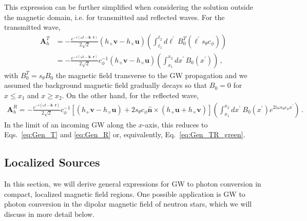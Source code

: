 \documentclass[a4paper,11pt]{article}
\begin{document}
%
This expression can be further simplified when considering the solution outside the magnetic domain, i.e. for transmitted and reflected waves.
%
For the transmitted wave,
%
\begin{equation}
    \begin{aligned}
    \bm{A}_{h}^{T} 
      & =
-\frac{e^{- i (\omega t - \bm{k} \cdot \bm{r})}}{2\sqrt{2}}    \left(  h_{+} \bm{v} - h_{\times} \bm{u}  \right) \left( \int_{\ell_{1}}^{\ell_{2}} d\ell^{\prime} \, B_{0}^T(\ell^{\prime} s_{\theta} c_{\phi} ) \right)  \\
  & =
-\frac{e^{- i (\omega t - \bm{k} \cdot \bm{r})}}{2\sqrt{2}}   c_{\phi}^{-1}  \left(  h_{+} \bm{v} - h_{\times} \bm{u}  \right) \left( \int_{x_{1}}^{x_{2}} dx^{\prime} \, B_{0}(x^{\prime}) \right) \,,
\label{eq:AT_domain_revisited}
\end{aligned}
\end{equation}
%
with $B_0^T = s_\theta B_0$ the magnetic field transverse to the GW propagation and we assumed the background magnetic field gradually decays so that $ B_{0} = 0 $ for $ x \leq x_{1}$ and $ x \geq x_{2} $.
%
On the other hand, for the reflected wave,
%
\begin{equation}
    \begin{aligned}
    \bm{A}_{h}^{R} 
    = 
    -\frac{e^{- i (\omega t - \bar{\bm{k}} \cdot \bm{r})}}{2\sqrt{2} }   c_{\phi}^{-1} \left[  \left(  h_{+} \bm{v} - h_{\times} \bm{u}  \right)  + 2 s_{\theta} c_{\phi} \hat{\bm{n}} \times \left(  h_{+} \bm{u} + h_{\times} \bm{v}  \right)  \right] \left( \int_{x_{1}}^{x_{2}}  dx^{\prime} ~ B_{0}(x^{\prime}) e^{2 i \omega s_{\theta} c_{\phi} x^{\prime}} \right)  \,.
    \end{aligned}
\end{equation}
%
In the limit of an incoming GW along the $x$-axis, this reduces to Eqs.~\eqref{eq:Gen_T} and \eqref{eq:Gen_R} or, equivalently, Eq.~\eqref{eq:Gen_TR_green}.




\subsection{Localized Sources}
\label{sec:localized_sources}


In this section, we will derive general expressions for GW to photon conversion in compact, localized magnetic field regions.
%
One possible application is GW to photon conversion in the dipolar magnetic field of neutron stars, which we will discuss in more detail below.
\end{document}
